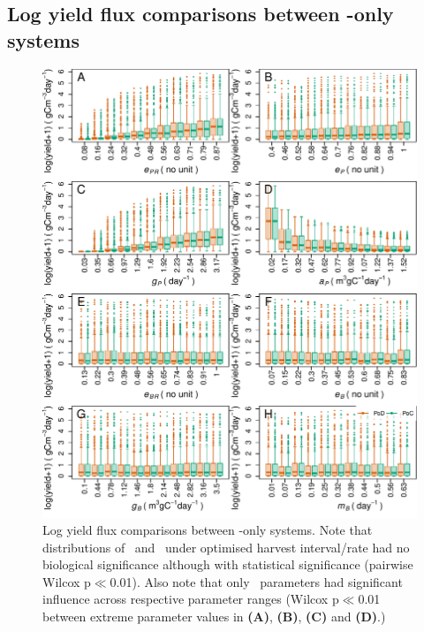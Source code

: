 \documentclass[env.tex]{subfiles}
\begin{document}
\subsection{Log yield flux comparisons between \phy-only systems}
\begin{figure}[H]
    \centering
    \includegraphics[width=.95\linewidth]{result/harvP.pdf}
    \caption[Log yield flux comparisons between \phy-only systems]{Log yield flux comparisons between \phy-only systems.  Note that distributions of \PoH\ and \PoN\ under optimised harvest interval/rate had no biological significance although with statistical significance (pairwise Wilcox p$\ll$0.01).  Also note that only \phy\ parameters had significant influence across respective parameter ranges (Wilcox p$\ll$0.01 between extreme parameter values in \textbf{(A)}, \textbf{(B)}, \textbf{(C)} and \textbf{(D)}.)\lnExplain}
    \label{f:harvPo}
\end{figure}
\end{document}
